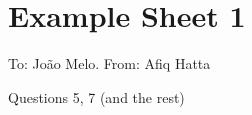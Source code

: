 \pagebreak

\section{Example Sheet 1} 
To: João Melo. 
From: Afiq Hatta

Questions 5, 7 (and the rest) 
\pagebreak 
